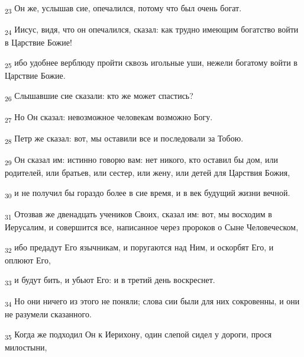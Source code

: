 \begin{tcolorbox}
\textsubscript{23} Он же, услышав сие, опечалился, потому что был очень богат.
\end{tcolorbox}
\begin{tcolorbox}
\textsubscript{24} Иисус, видя, что он опечалился, сказал: как трудно имеющим богатство войти в Царствие Божие!
\end{tcolorbox}
\begin{tcolorbox}
\textsubscript{25} ибо удобнее верблюду пройти сквозь игольные уши, нежели богатому войти в Царствие Божие.
\end{tcolorbox}
\begin{tcolorbox}
\textsubscript{26} Слышавшие сие сказали: кто же может спастись?
\end{tcolorbox}
\begin{tcolorbox}
\textsubscript{27} Но Он сказал: невозможное человекам возможно Богу.
\end{tcolorbox}
\begin{tcolorbox}
\textsubscript{28} Петр же сказал: вот, мы оставили все и последовали за Тобою.
\end{tcolorbox}
\begin{tcolorbox}
\textsubscript{29} Он сказал им: истинно говорю вам: нет никого, кто оставил бы дом, или родителей, или братьев, или сестер, или жену, или детей для Царствия Божия,
\end{tcolorbox}
\begin{tcolorbox}
\textsubscript{30} и не получил бы гораздо более в сие время, и в век будущий жизни вечной.
\end{tcolorbox}
\begin{tcolorbox}
\textsubscript{31} Отозвав же двенадцать учеников Своих, сказал им: вот, мы восходим в Иерусалим, и совершится все, написанное через пророков о Сыне Человеческом,
\end{tcolorbox}
\begin{tcolorbox}
\textsubscript{32} ибо предадут Его язычникам, и поругаются над Ним, и оскорбят Его, и оплюют Его,
\end{tcolorbox}
\begin{tcolorbox}
\textsubscript{33} и будут бить, и убьют Его: и в третий день воскреснет.
\end{tcolorbox}
\begin{tcolorbox}
\textsubscript{34} Но они ничего из этого не поняли; слова сии были для них сокровенны, и они не разумели сказанного.
\end{tcolorbox}
\begin{tcolorbox}
\textsubscript{35} Когда же подходил Он к Иерихону, один слепой сидел у дороги, прося милостыни,
\end{tcolorbox}
